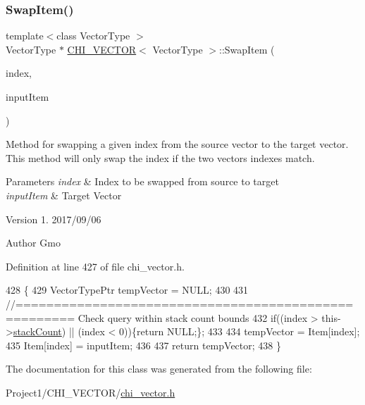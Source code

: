\subsubsection{\texorpdfstring{Swap\+Item()}{SwapItem()}}
{\footnotesize\ttfamily template$<$class Vector\+Type $>$ \\
Vector\+Type $\ast$ \hyperlink{class_c_h_i___v_e_c_t_o_r}{C\+H\+I\+\_\+\+V\+E\+C\+T\+OR}$<$ Vector\+Type $>$\+::Swap\+Item (\begin{DoxyParamCaption}\item[{long int}]{index,  }\item[{Vector\+Type\+Ptr}]{input\+Item }\end{DoxyParamCaption})}

Method for swapping a given index from the source vector to the target vector. This method will only swap the index if the two vectors indexes match.


\begin{DoxyParams}{Parameters}
{\em index} & Index to be swapped from source to target \\
\hline
{\em input\+Item} & Target Vector\\
\hline
\end{DoxyParams}
\begin{DoxyVersion}{Version}
1. 2017/09/06 
\end{DoxyVersion}
\begin{DoxyAuthor}{Author}
Gmo 
\end{DoxyAuthor}


Definition at line 427 of file chi\+\_\+vector.\+h.


\begin{DoxyCode}
428 \{
429     VectorTypePtr tempVector = NULL;
430 
431     \textcolor{comment}{//===================================================== Check query within stack count bounds}
432     \textcolor{keywordflow}{if}((index > this->\hyperlink{class_c_h_i___v_e_c_t_o_r_a91ef30712b0ead293dfe1adc29fee555}{stackCount}) || (index < 0))\{\textcolor{keywordflow}{return} NULL;\};
433 
434     tempVector = Item[index];
435     Item[index] = inputItem;
436 
437     \textcolor{keywordflow}{return} tempVector;
438 \}
\end{DoxyCode}


The documentation for this class was generated from the following file\+:\begin{DoxyCompactItemize}
\item 
Project1/\+C\+H\+I\+\_\+\+V\+E\+C\+T\+O\+R/\hyperlink{chi__vector_8h}{chi\+\_\+vector.\+h}\end{DoxyCompactItemize}
